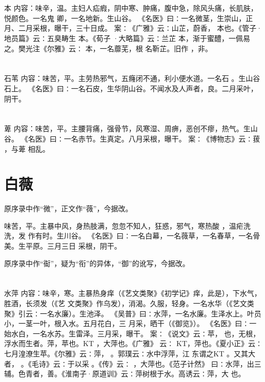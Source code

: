 \documentclass[12pt,UTF8]{ctexbook}
\begin{document}
\section{}本
内容：味辛，温。主妇人疝瘕，阴中寒、肿痛，腹中急，除风头痛，长肌肤，悦颜色。一名鬼 
卿，一名地新。生山谷。 
《名医》曰∶一名微茎，生崇山，正月、二月采根，曝干，三十日成。 
案∶《广雅》云∶山芷，蔚香， 本也。《管子·地员篇》云∶五臭畴生 本。《荀子 
·大略篇》云∶兰芷 本，渐于蜜醴，一佩易之。樊光注《尔雅》云∶ 本，一名蘼芜，根 
名靳芷。旧作 ，非。 


\section{}石苇
内容：味苦，平。主劳热邪气，五癃闭不通，利小便水道。一名石 。生山谷石上。 
《名医》曰∶一名石皮，生华阴山谷。不闻水及人声者，良。二月采叶，阴干。 


\section{}萆
内容：味苦，平。主腰背痛，强骨节，风寒湿、周痹，恶创不瘳，热气。生山谷。 
《名医》曰∶一名赤节。生真定。八月采根，曝干。 
案∶《博物志》云∶菝 ，与萆 相乱。 


\section{白薇}

原序录中作“微”，正文作“薇”，今据改。

味苦，平。主暴中风，身热肢满，忽忽不知人，狂惑，邪气，寒热酸 ，温疟洗洗，发 
作有时。生川谷。 
《名医》曰∶一名白幕，一名薇草，一名春草，一名骨美。生平原。三月三日 
采根，阴干。 

原序录中作“䘖”，疑为“衔”的异体，“御”的讹写，今据改。


\section{}水萍
内容：味辛，寒。主暴热身痒（《艺文类聚》《初学记》痒，此是），下水气，胜酒，长须发（《艺 
文类聚》作乌发），消渴。久服，轻身。一名水华（《艺文类聚》引云∶一名水廉）。生池泽。 
《吴普》曰∶水萍，一名水廉。生泽水上。叶员小，一茎一叶，根入水。五月花白，三 
月采，晒干（《御览》）。 
《名医》曰∶一始水白，一名水苏。生雷泽。三月采，曝干。 
案∶《说文》云∶苹， 也，无根，浮水而生者。萍，苹也。KT ，大萍也。《广雅》 
云∶ 
KT，萍也。《夏小正》云∶七月湟潦生苹。《尔雅》云∶萍， 。郭璞云∶水中浮萍，江 
东谓之KT 。又其大者， 。《毛诗》云∶于以采 。《传》云∶ ，大萍也。《范子计然》 
曰∶水萍，出三辅。色青者，善。《淮南子·原道训》云∶萍树根于水。高诱云∶萍，大 
也。 
\end{document}
